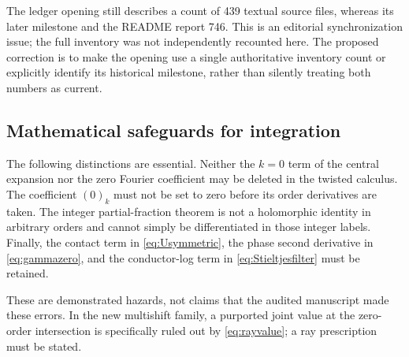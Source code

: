 \documentclass[11pt,a4paper]{article}
\numberwithin{equation}{section}
\theoremstyle{definition}\newtheorem{definition}[theorem]{Definition}
\theoremstyle{remark}\newtheorem{remark}[theorem]{Remark}
\begin{document}
The ledger opening still describes a count of 439 textual source files,
whereas its later milestone and the README report 746. This is an
editorial synchronization issue; the full inventory was not independently
recounted here. The proposed correction is to make the opening use a
single authoritative inventory count or explicitly identify its historical
milestone, rather than silently treating both numbers as current.

\subsection{Mathematical safeguards for integration}
The following distinctions are essential. Neither the $k=0$ term of the central expansion nor the zero Fourier
coefficient may be deleted in the twisted calculus. The coefficient
$(0)_k$ must not be set to zero before its order derivatives are taken.
The integer partial-fraction theorem is not a holomorphic identity in
arbitrary orders and cannot simply be differentiated in those integer
labels. Finally, the contact term in \eqref{eq:Usymmetric}, the phase
second derivative in \eqref{eq:gammazero}, and the conductor-log term
in \eqref{eq:Stieltjesfilter} must be retained.

These are demonstrated hazards, not claims that the audited manuscript
made these errors. In the new multishift family, a purported joint
value at the zero-order intersection is specifically ruled out by
\eqref{eq:rayvalue}; a ray prescription must be stated.
\end{document}
